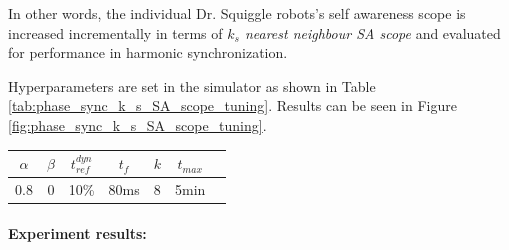 				In other words, the individual Dr. Squiggle robots's self awareness scope is increased incrementally in terms of \textit{$k_s$ nearest neighbour SA scope} and evaluated for performance in harmonic synchronization.

				Hyperparameters are set in the simulator as shown in Table \ref{tab:phase_sync_k_s_SA_scope_tuning}. Results can be seen in Figure \ref{fig:phase_sync_k_s_SA_scope_tuning}.

				\begin{center}
				\begin{tabular}{ |c|c|c|c|c|c|c| } 
				\hline
				$\alpha$ & $\beta$ & $t_{ref}^{dyn}$ & $t_f$ & $k$ & $t_{max}$ \\
				\hline
				0.8 & 0 & 10\% & 80ms & 8 & 5min \\
				\hline
				\end{tabular}
				\label{tab:phase_sync_k_s_SA_scope_tuning}
				\end{center}
				
				\paragraph{Experiment results:\nl}


